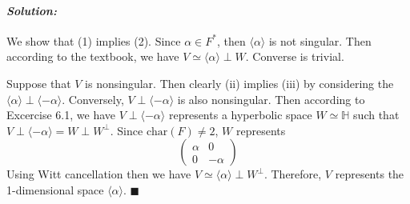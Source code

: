 \documentclass[12pt, a4paper]{article}
\newenvironment{solution}
  {\paragraph{\textit{Solution:}}\par\medskip}
  {\hfill$\blacksquare$\vspace{0.1cm}}
\begin{document}
\begin{solution}
    We show that (1) implies (2). Since $\alpha\in F^*$, then $\langle \alpha \rangle$ is not singular.
    Then according to the textbook, we have $V\simeq \langle \alpha\rangle \perp W$.
    Converse is trivial.
    
    Suppose that $V$ is nonsingular. Then clearly (ii) implies (iii) by considering the $\langle\alpha\rangle\perp \langle-\alpha\rangle$.
    Conversely, $V\perp \langle -\alpha\rangle$ is also nonsingular. Then according to Excercise 6.1, we have $V\perp \langle -\alpha \rangle$ represents a hyperbolic space $W\simeq\mathbb{H}$ such that $V\perp \langle-\alpha\rangle = W\perp W^{\perp}$.
    Since $\text{char}(F)\neq 2$, $W$ represents $$ \begin{pmatrix} \alpha & 0 \\ 0 & -\alpha \end{pmatrix} $$
    Using Witt cancellation then we have $V\simeq \langle \alpha \rangle\perp W^{\perp}$.
    Therefore, $V$ represents the 1-dimensional space $\langle \alpha \rangle$.
\end{solution}
\end{document}
